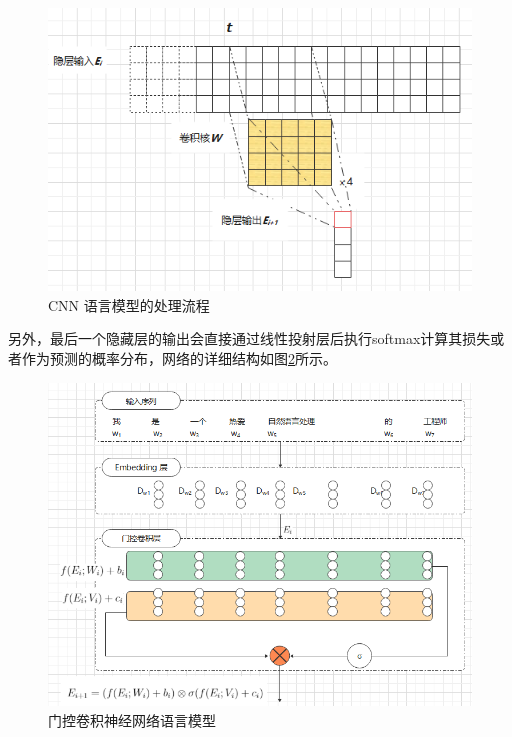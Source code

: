 \documentclass[twoside,a4paper,12pt]{book}%
\begin{document}
\begin{figure}[htbp]
\begin{center}
\includegraphics[width=5.5in]{figures/cnnlm1.png}
\caption{CNN 语言模型的处理流程}
\label{fig:cnnlm1}
\end{center}
\end{figure}
另外，最后一个隐藏层的输出会直接通过线性投射层后执行softmax计算其损失或者作为预测的概率分布，网络的详细结构如图\ref{fig:cnnlm2}所示。
\begin{figure}[htbp]
\begin{center}
\includegraphics[width=5.6in]{figures/cnnlm2.png} 
\caption{门控卷积神经网络语言模型}\label{fig:cnnlm2}
\end{center}
\end{figure}
\end{document}
